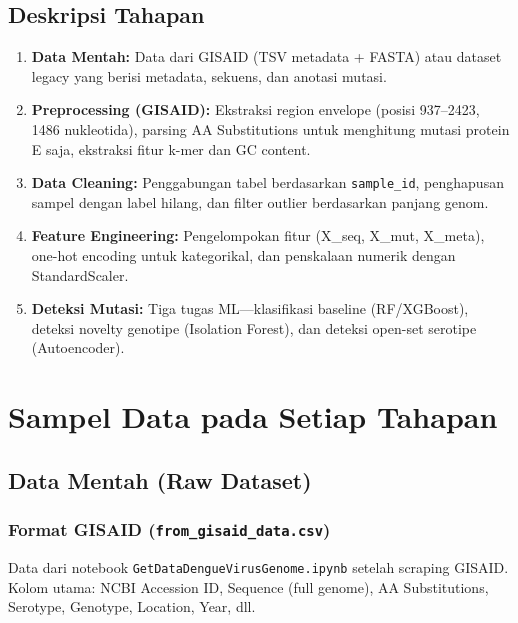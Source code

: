 \documentclass[12pt,a4paper]{article}
\begin{document}
\subsection{Deskripsi Tahapan}

\begin{enumerate}
    \item \textbf{Data Mentah:} Data dari GISAID (TSV metadata + FASTA) atau dataset legacy yang berisi metadata, sekuens, dan anotasi mutasi.
    
    \item \textbf{Preprocessing (GISAID):} Ekstraksi region envelope (posisi 937--2423, 1486 nukleotida), parsing AA Substitutions untuk menghitung mutasi protein E saja, ekstraksi fitur k-mer dan GC content.
    
    \item \textbf{Data Cleaning:} Penggabungan tabel berdasarkan \texttt{sample\_id}, penghapusan sampel dengan label hilang, dan filter outlier berdasarkan panjang genom.
    
    \item \textbf{Feature Engineering:} Pengelompokan fitur (X\_seq, X\_mut, X\_meta), one-hot encoding untuk kategorikal, dan penskalaan numerik dengan StandardScaler.
    
    \item \textbf{Deteksi Mutasi:} Tiga tugas ML---klasifikasi baseline (RF/XGBoost), deteksi novelty genotipe (Isolation Forest), dan deteksi open-set serotipe (Autoencoder).
\end{enumerate}

\section{Sampel Data pada Setiap Tahapan}

\subsection{Data Mentah (Raw Dataset)}

\subsubsection{Format GISAID (\texttt{from\_gisaid\_data.csv})}

Data dari notebook \texttt{GetDataDengueVirusGenome.ipynb} setelah scraping GISAID. Kolom utama: NCBI Accession ID, Sequence (full genome), AA Substitutions, Serotype, Genotype, Location, Year, dll.
\end{document}
